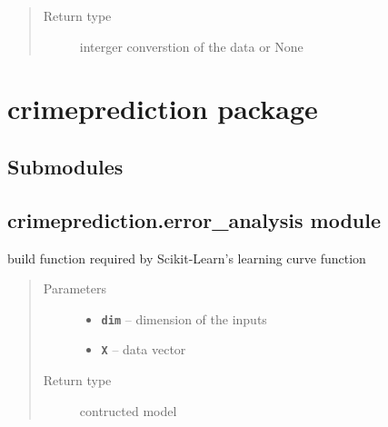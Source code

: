\documentclass[letterpaper,10pt,english]{sphinxmanual}
\begin{document}
\begin{fulllineitems}
\begin{fulllineitems}
\begin{quote}
\begin{description}
\item[{Return type}] \leavevmode
interger converstion of the data or None

\end{description}\end{quote}

\end{fulllineitems}


\end{fulllineitems}



\section{crimeprediction package}
\label{api/crimeprediction:crimeprediction-package}\label{api/crimeprediction::doc}

\subsection{Submodules}
\label{api/crimeprediction:submodules}

\subsection{crimeprediction.error\_analysis module}
\label{api/crimeprediction:crimeprediction-error-analysis-module}\label{api/crimeprediction:module-crimeprediction.error_analysis}

\begin{fulllineitems}
\label{api/crimeprediction:crimeprediction.error_analysis.build_model}
build function required by Scikit-Learn's learning curve function
\begin{quote}\begin{description}
\item[{Parameters}] \leavevmode\begin{itemize}
\item {} 
\textbf{\texttt{dim}} -- dimension of the inputs

\item {} 
\textbf{\texttt{X}} -- data vector

\end{itemize}

\item[{Return type}] \leavevmode
contructed model

\end{description}\end{quote}

\end{fulllineitems}
\end{document}
